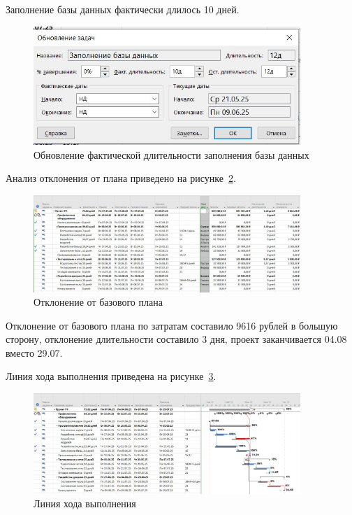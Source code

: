 Заполнение базы данных фактически длилось 10 дней.

\begin{figure}[H]
	\centering
	\includegraphics[width=0.9\textwidth]{img/task10/screen10_6.jpg}
	\caption{Обновление фактической длительности заполнения базы данных}
	\label{fig:screen10_6}
\end{figure}

Анализ отклонения от плана приведено на рисунке~\ref{fig:screen10_7}.

\begin{figure}[H]
	\centering
	\includegraphics[width=0.9\textwidth]{img/task10/screen10_7.jpg}
	\caption{Отклонение от базового плана}
	\label{fig:screen10_7}
\end{figure}

Отклонение от базового плана по затратам составило 9616 рублей в большую сторону, отклонение длительности составило 3 дня, проект заканчивается 04.08 вместо 29.07.

Линия хода выполнения приведена на рисунке~\ref{fig:screen10_9}.

\begin{figure}[H]
	\centering
	\includegraphics[width=0.9\textwidth]{img/task10/screen10_9.jpg}
	\caption{Линия хода выполнения}
	\label{fig:screen10_9}
\end{figure}

